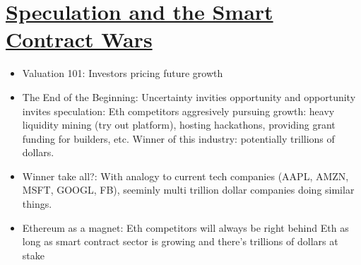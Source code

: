 \documentclass{../../notes}
\begin{document}
\section{\href{run:./speculation-and-the-smart-contract-wars.pdf}{Speculation and the Smart Contract Wars}}
\begin{itemize}
    \item Valuation 101: Investors pricing future growth
    \item The End of the Beginning: Uncertainty invities opportunity and opportunity invites speculation: Eth competitors aggresively pursuing growth: heavy liquidity mining (try out platform), hosting hackathons, providing grant funding for builders, etc. Winner of this industry: potentially trillions of dollars. 
    \item Winner take all?: With analogy to current tech companies (AAPL, AMZN, MSFT, GOOGL, FB), seeminly multi trillion dollar companies doing similar things. 
    \item Ethereum as a magnet: Eth competitors will always be right behind Eth as long as smart contract sector is growing and there's trillions of dollars at stake
\end{itemize}
\end{document}
